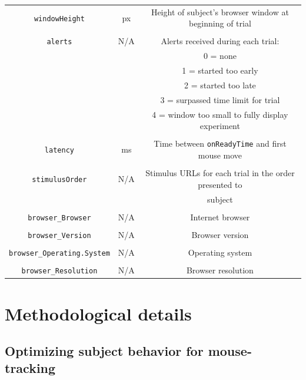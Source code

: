 \documentclass[]{article}
\begin{document}
\begin{table}[H]
\begin{tabular}{@{}ccc@{}}
\texttt{windowHeight}              & px & Height of subject's browser window at beginning of trial \\ \\
\texttt{alerts}              & N/A & Alerts received during each trial: \\&&0 = none \\&&1 = started too early \\&&2 = started too late \\&&3 = surpassed time limit for trial \\&&4 = window too small to fully display experiment \\ \\
\texttt{latency}              & ms & Time between \texttt{onReadyTime} and first mouse move \\ \\
\texttt{stimulusOrder}              & N/A & Stimulus URLs for each trial in the order presented to \\&&subject \\ \\
\texttt{browser\_Browser}              & N/A & Internet browser \\ \\
\texttt{browser\_Version}              & N/A & Browser version\\ \\
\texttt{browser\_Operating.System}              & N/A & Operating system \\ \\
\texttt{browser\_Resolution}              & N/A & Browser resolution \\
\bottomrule
\end{tabular}
\end{table}

\singlespacing

\section{Methodological details}

\subsection{Optimizing subject behavior for mouse-tracking}
\label{sec:opt_behav}
\end{document}
